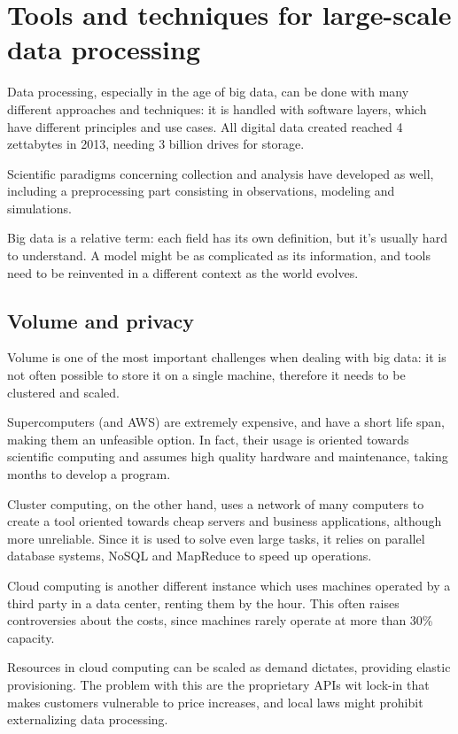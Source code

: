 \section{Tools and techniques for large-scale data processing}
Data processing, especially in the age of big data, can be done with many different approaches and techniques: it is handled with software layers, which have different principles and use cases. All digital data created reached 4 zettabytes in 2013, needing 3 billion drives for storage.

Scientific paradigms concerning collection and analysis have developed as well, including a preprocessing part consisting in observations, modeling and simulations.

Big data is a relative term: each field has its own definition, but it's usually hard to understand. A model might be as complicated as its information, and tools need to be reinvented in a different context as the world evolves.

\subsection{Volume and privacy}
Volume is one of the most important challenges when dealing with big data: it is not often possible to store it on a single machine, therefore it needs to be clustered and scaled. 

Supercomputers (and AWS) are extremely expensive, and have a short life span, making them an unfeasible option. In fact, their usage is oriented towards scientific computing and assumes high quality hardware and maintenance, taking months to develop a program. 

Cluster computing, on the other hand, uses a network of many computers to create a tool oriented towards cheap servers and business applications, although more unreliable. Since it is used to solve even large tasks, it relies on parallel database systems, NoSQL and MapReduce to speed up operations. 

Cloud computing is another different instance which uses machines operated by a third party in a data center, renting them by the hour. This often raises controversies about the costs, since machines rarely operate at more than 30\% capacity.

Resources in cloud computing can be scaled as demand dictates, providing elastic provisioning. The problem with this are the proprietary APIs wit lock-in that makes customers vulnerable to price increases, and local laws might prohibit externalizing data processing. 

